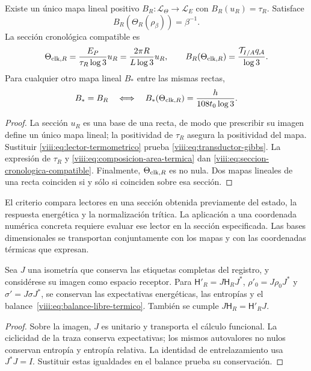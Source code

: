 \begin{theorem}
\label{viii:thm:identificacion-transductor}
Existe un único mapa lineal positivo
\(B_R:\mathcal L_\Theta\to\mathcal L_E\) con
\(B_R(u_R)=\tau_R\). Satisface
\begin{equation}
 B_R(\Theta_R(\rho_\beta))=\beta^{-1}.
 \label{viii:eq:transductor-gibbs}
\end{equation}
La sección cronológica compatible es
\begin{equation}
 \Theta_{{\rm clk},R}
 =\frac{E_P}{\tau_R\log3}u_R
 =\frac{2\pi R}{L\log3}u_R,
 \qquad
 B_R(\Theta_{{\rm clk},R})=
 \frac{\mathcal T_{I/A}q_{\mathcal A}}{\log3}.
 \label{viii:eq:seccion-cronologica-compatible}
\end{equation}
Para cualquier otro mapa lineal \(B_*\) entre las mismas rectas,
\begin{equation}
 B_*=B_R
 \quad\Longleftrightarrow\quad
 B_*(\Theta_{{\rm clk},R})=\frac{h}{108t_0\log3}.
 \label{viii:eq:criterio-una-seccion}
\end{equation}
\end{theorem}
\begin{proof}
La sección \(u_R\) es una base de una recta, de modo que prescribir
su imagen define un único mapa lineal; la positividad de \(\tau_R\)
asegura la positividad del mapa. Sustituir
\eqref{viii:eq:lector-termometrico} prueba
\eqref{viii:eq:transductor-gibbs}. La expresión de \(\tau_R\) y
\eqref{viii:eq:composicion-area-termica} dan
\eqref{viii:eq:seccion-cronologica-compatible}. Finalmente,
\(\Theta_{{\rm clk},R}\) es no nula. Dos mapas lineales de una
recta coinciden si y sólo si coinciden sobre esa sección.
\end{proof}

El criterio compara lectores en una sección obtenida previamente del
estado, la respuesta energética y la normalización trítica. La aplicación
a una coordenada numérica concreta requiere evaluar ese lector en la
sección especificada. Las bases dimensionales se transportan conjuntamente
con los mapas y con las coordenadas térmicas que expresan.

\begin{proposition}
\label{viii:prop:transporte-termico-memoria}
Sea \(J\) una isometría que conserva las etiquetas completas del
registro, y considérese su imagen como espacio receptor. Para
\(\mathsf H'_R=J\mathsf H_RJ^*\), \(\rho'_0=J\rho_0J^*\)
y \(\sigma'=J\sigma J^*\), se conservan las expectativas energéticas,
las entropías y el balance~\eqref{viii:eq:balance-libre-termico}.
También se cumple \(J\mathsf H_R=\mathsf H'_RJ\).
\end{proposition}
\begin{proof}
Sobre la imagen, \(J\) es unitario y transporta el cálculo funcional.
La ciclicidad de la traza conserva expectativas; los mismos autovalores
no nulos conservan entropía y entropía relativa. La identidad de
entrelazamiento usa \(J^*J=I\). Sustituir estas igualdades en el balance
prueba su conservación.
\end{proof}

